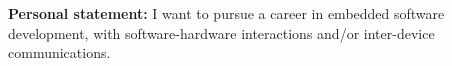 %
%

\par{
{\textbf{Personal statement:}} 
I want to pursue a career in embedded software development, with software-hardware interactions and/or inter-device communications.
}